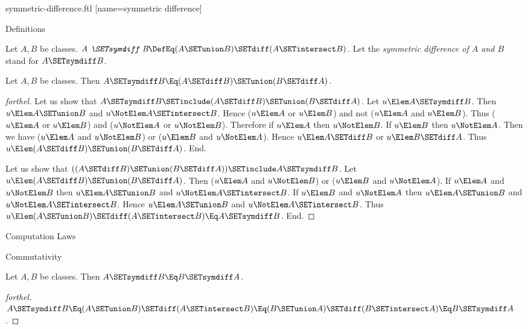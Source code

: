 \documentclass{stex}
\begin{document}
\begin{smodule}{symmetric-difference.ftl}
[name=symmetric difference]{\,\triangle\,}

\begin{sfragment}{Definitions}
  \begin{definition}[forthel,for=symmetric difference]
    Let $A, B$ be classes.
    $\emph{A \SETsymdiff B} \DefEq (A \SETunion B) \SETdiff (A \SETintersect B)$.
    Let the \emph{symmetric difference of $A$ and $B$} stand for $A \SETsymdiff B$.
  \end{definition}

  \begin{proposition}[forthel]
    Let $A, B$ be classes.
    Then $A \SETsymdiff B \Eq (A \SETdiff B) \SETunion (B \SETdiff A)$.
  \end{proposition}
  \begin{proof}[forthel]
    Let us show that $A \SETsymdiff B \SETinclude (A \SETdiff B) \SETunion (B \SETdiff A)$.
      Let $u \Elem A \SETsymdiff B$.
      Then $u \Elem A \SETunion B$ and $u \NotElem A \SETintersect B$.
      Hence ($u \Elem A$ or $u \Elem B$) and not ($u \Elem A$ and $u \Elem B$).
      Thus ($u \Elem A$ or $u \Elem B$) and ($u \NotElem A$ or $u \NotElem B$).
      Therefore if $u \Elem A$ then $u \NotElem B$.
      If $u \Elem B$ then $u \NotElem A$.
      Then we have ($u \Elem A$ and $u \NotElem B$) or ($u \Elem B$ and $u \NotElem A$).
      Hence $u \Elem A \SETdiff B$ or $u \Elem B \SETdiff A$.
      Thus $u \Elem (A \SETdiff B) \SETunion (B \SETdiff A)$.
    End.

    Let us show that $((A \SETdiff B) \SETunion (B \SETdiff A)) \SETinclude A \SETsymdiff B$. %
      Let $u \Elem (A \SETdiff B) \SETunion (B \SETdiff A)$.
      Then ($u \Elem A$ and $u \NotElem B$) or ($u \Elem B$ and $u \NotElem A$).
      If $u \Elem A$ and $u \NotElem B$ then $u \Elem A \SETunion B$ and $u \NotElem A \SETintersect B$.
      If $u \Elem B$ and $u \NotElem A$ then $u \Elem A \SETunion B$ and $u \NotElem A \SETintersect B$.
      Hence $u \Elem A \SETunion B$ and $u \NotElem A \SETintersect B$.
      Thus $u \Elem (A \SETunion B) \SETdiff (A \SETintersect B) \Eq A \SETsymdiff B$.
    End.
  \end{proof}
\end{sfragment}

\begin{sfragment}{Computation Laws}
  \begin{sfragment}{Commutativity}
    \begin{proposition}[forthel]
      Let $A, B$ be classes.
      Then $A \SETsymdiff B \Eq B \SETsymdiff A$.
    \end{proposition}
    \begin{proof}[forthel]
      $A \SETsymdiff B
        \Eq (A \SETunion B) \SETdiff (A \SETintersect B)
        \Eq (B \SETunion A) \SETdiff (B \SETintersect A)
        \Eq B \SETsymdiff A$.
    \end{proof}
  \end{sfragment}


\end{sfragment}
\end{smodule}
\end{document}
